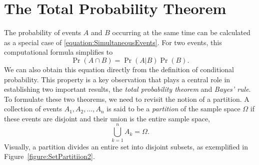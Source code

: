 \section{The Total Probability Theorem}

The probability of events $A$ and $B$ occurring at the same time can be calculated as a special case of \eqref{equation:SimultaneousEvents}.
For two events, this computational formula simplifies to
\begin{equation} \label{equation:ProbabilityIntersection}
\Pr (A \cap B) = \Pr (A|B) \Pr (B) .
\end{equation}
We can also obtain this equation directly from the definition of conditional probability.
This property is a key observation that plays a central role in establishing two important results, the \emph{total probability theorem} and \emph{Bayes' rule}.
To formulate these two theorems, we need to revisit the notion of a partition.
A collection of events $A_1, A_2, \ldots, A_n$ is said to be a \emph{partition} of the sample space $\Omega$ if these events are disjoint and their union is the entire sample space, 
\begin{equation*}
\bigcup_{k=1}^n A_k = \Omega .
\end{equation*}
Visually, a partition divides an entire set into disjoint subsets, as exemplified in Figure~\ref{figure:SetPartitiion2}.

